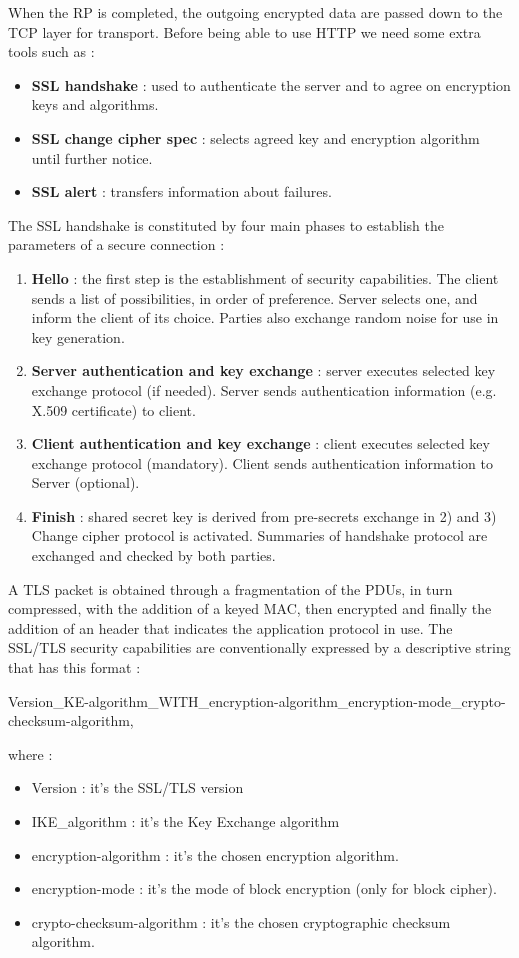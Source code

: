 \documentclass[11pt]{article}
\begin{document}
When the RP is completed, the outgoing encrypted data are passed down to the TCP layer for transport. Before being able to use HTTP we need some extra tools such as :
\begin{itemize}
\item \textbf{SSL handshake} : used to authenticate the server and to agree on encryption keys and algorithms.
\item \textbf{SSL change cipher spec} : selects agreed key and encryption algorithm until further notice.
\item \textbf{SSL alert} : transfers information about failures.
\end{itemize}
The SSL handshake is constituted by four main phases to establish the parameters of a secure connection :
\begin{enumerate}
\item \textbf{Hello} : the first step is the establishment of security capabilities. The client sends a list of possibilities, in order of preference. Server selects one, and inform the client of its choice. Parties also exchange random noise for use in key generation.
\item \textbf{Server authentication and key exchange} : server executes selected key exchange protocol (if needed). Server sends authentication information (e.g. X.509 certificate) to client.
\item \textbf{Client authentication and key exchange} : client executes selected key exchange protocol (mandatory). Client sends authentication information to Server (optional).
\item \textbf{Finish} : shared secret key is derived from pre-secrets exchange in 2) and 3) Change cipher protocol is activated. Summaries of handshake protocol are exchanged and checked by both parties.
\end{enumerate}
A TLS packet is obtained through a fragmentation of the PDUs, in turn compressed, with the addition of a keyed MAC, then encrypted and finally the addition of an header that indicates the application protocol in use. The SSL/TLS security capabilities are conventionally expressed by a descriptive string that has this format :
\begin{center}
Version\_KE-algorithm\_WITH\_encryption-algorithm\_encryption-mode\_crypto-checksum-algorithm,
\end{center}
where :
\begin{itemize}
\item Version : it's the SSL/TLS version
\item IKE\_algorithm : it's the Key Exchange algorithm
\item encryption-algorithm : it's the chosen encryption algorithm.
\item encryption-mode : it's the mode of block encryption (only for block cipher).
\item crypto-checksum-algorithm : it's the chosen cryptographic checksum algorithm.
\end{itemize}
\end{document}
